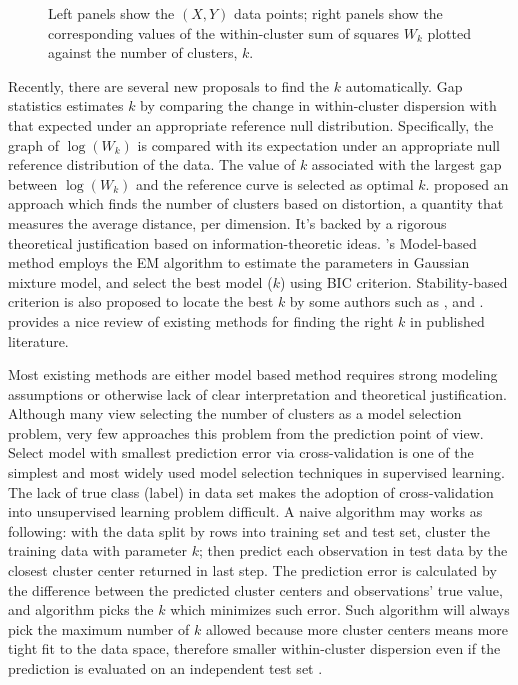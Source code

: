 \documentclass[12pt]{article}
\begin{document}
\begin{figure}
\begin{minipage}{\linewidth}
\begin{minipage}{0.45\linewidth}
  \end{minipage}
\end{minipage}
\caption{Left panels show the $(X,Y)$ data points; right panels
  show the corresponding values of the within-cluster sum of squares $W_k$
plotted against the number of clusters, $k$.}
\label{fig:elbow}
\end{figure}

Recently, there are several new proposals to find the $k$ automatically. Gap
statistics \citep{tibshirani2001estimating} estimates $k$ by comparing the
change in within-cluster dispersion with that expected under an appropriate
reference null distribution. Specifically, the graph of $\log(W_k)$ is
compared with its expectation under an appropriate null reference distribution
of the data. The value of $k$ associated with the largest gap between
$\log(W_k)$ and the reference curve is selected as optimal $k$.
\citet{sugar2003finding} proposed an approach which finds the number of
clusters based on distortion, a quantity that measures the average distance,
per dimension. It's backed by a rigorous theoretical justification based on
information-theoretic ideas.   \citet{fraley2002model}'s Model-based method
employs the EM algorithm to estimate the parameters in Gaussian mixture model,
and select the best model ($k$) using BIC criterion. Stability-based criterion
is also proposed to locate the best $k$ by some authors such as
\citet{ben2001stability}, \citet{wang2010consistent} and
\citet{fang2012selection}. \citet{chiang2010intelligent} provides a nice review
of existing methods for finding the right $k$ in published literature.

Most existing methods are either model based method requires strong modeling
assumptions or otherwise lack of clear interpretation and theoretical justification.
Although many view selecting the number of clusters as a model selection problem, very few
approaches this problem from the prediction point of view. Select model with
smallest prediction error via cross-validation is one of the simplest and most
widely used model selection techniques in supervised learning. The lack of
true class (label) in data set makes the adoption of cross-validation into
unsupervised learning problem difficult. A naive algorithm may works as following:
with the data split by rows into training set and test set, cluster the training 
data with parameter $k$; then predict each observation in test data by the closest
cluster center returned in last step. The prediction error is calculated by the 
difference between the predicted cluster centers and observations' true value, and algorithm 
picks the $k$ which minimizes such error. Such algorithm will always pick the maximum number 
of $k$ allowed because more cluster centers means more tight fit to the data space, therefore
smaller within-cluster dispersion even if the prediction is evaluated on an independent
test set \citep{hastie2009elements}.
\end{document}
